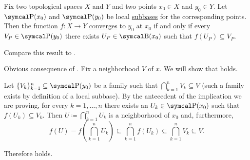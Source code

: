 \begin{Proposition}\label{thm:cauchy_function_convergence_via_subbases}
  Fix two topological spaces \( X \) and \( Y \) and two points \( x_0 \in X \) and \( y_0 \in Y \). Let \( \CP(x_0) \) and \( \CP(y_0) \) be local \hyperref[def:topological_local_subbase]{subbases} for the corresponding points. Then the function \( f: X \to Y \) \hyperref[def:local_convergence]{converges} to \( y_0 \) at \( x_0 \) if and only if every \( V_P \in \CP(y_0) \) there exists \( U_P \in \CB(x_0) \) such that \( f(U_P) \subseteq V_P \).

  Compare this result to .
\end{Proposition}
\begin{RefListProof}
    \ISufficiency Obvious consequence of .
    \INecessity Fix a neighborhood \( V \) of \( x \). We will show that  holds.

    Let \( \{ V_k \}_{k=1}^n \subseteq \CP(y_0) \) be a family such that \( \bigcap_{k=1}^n V_k \subseteq V \) (such a family exists by definition of a local subbase). By the antecedent of the implication we are proving, for every \( k = 1, \ldots, n \) there exists an \( U_k \in \CP(x_0) \) such that \( f(U_k) \subseteq V_k \). Then \( U \coloneqq \bigcap_{k=1}^n U_k \) is a neighborhood of \( x_0 \) and, furthermore,
    \begin{equation*}
      f(U)
      =
      f\left(\bigcap_{k=1}^n U_k \right)
      \subseteq
      \bigcap_{k=1}^n f(U_k)
      \subseteq
      \bigcap_{k=1}^n V_k
      \subseteq
      V.
    \end{equation*}

    Therefore  holds.
\end{RefListProof}
